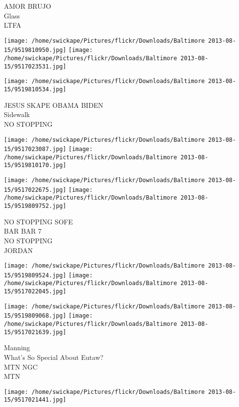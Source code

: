 \documentclass[10pt,letterpaper]{article}
\begin{document}
AMOR BRUJO\\
Glass\\
LTFA\\
\pagebreak

\texttt{[image: /home/swickape/Pictures/flickr/Downloads/Baltimore 2013-08-15/9519810950.jpg]}
\texttt{[image: /home/swickape/Pictures/flickr/Downloads/Baltimore 2013-08-15/9517023531.jpg]}

\vspace{0.25in}
\texttt{[image: /home/swickape/Pictures/flickr/Downloads/Baltimore 2013-08-15/9519810534.jpg]}

JESUS SKAPE OBAMA BIDEN\\
Sidewalk\\
NO STOPPING\\
\pagebreak

\texttt{[image: /home/swickape/Pictures/flickr/Downloads/Baltimore 2013-08-15/9517023087.jpg]}
\texttt{[image: /home/swickape/Pictures/flickr/Downloads/Baltimore 2013-08-15/9519810170.jpg]}

\texttt{[image: /home/swickape/Pictures/flickr/Downloads/Baltimore 2013-08-15/9517022675.jpg]}
\texttt{[image: /home/swickape/Pictures/flickr/Downloads/Baltimore 2013-08-15/9519809752.jpg]}

NO STOPPING SOFE\\
BAR BAR 7\\
NO STOPPING\\
JORDAN\\
\pagebreak

\texttt{[image: /home/swickape/Pictures/flickr/Downloads/Baltimore 2013-08-15/9519809524.jpg]}
\texttt{[image: /home/swickape/Pictures/flickr/Downloads/Baltimore 2013-08-15/9517022045.jpg]}

\texttt{[image: /home/swickape/Pictures/flickr/Downloads/Baltimore 2013-08-15/9519809068.jpg]}
\texttt{[image: /home/swickape/Pictures/flickr/Downloads/Baltimore 2013-08-15/9517021639.jpg]}

Manning\\
What's So Special About Eutaw?\\
MTN NGC\\
MTN\\
\pagebreak

\texttt{[image: /home/swickape/Pictures/flickr/Downloads/Baltimore 2013-08-15/9517021441.jpg]}
\end{document}
